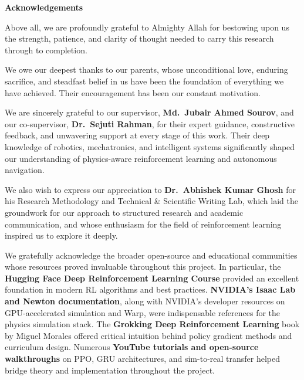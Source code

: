 \documentclass[12pt,a4paper]{article}
\begin{document}
\thispagestyle{empty}
\vspace*{0.5cm}
\begin{center}
    {\Large\textbf{Acknowledgements}}
\end{center}
\vspace{1.2cm}

\noindent
Above all, we are profoundly grateful to Almighty Allah for bestowing upon us the strength, patience, and clarity of thought needed to carry this research through to completion.

\vspace{0.8em}
\noindent
We owe our deepest thanks to our parents, whose unconditional love, enduring sacrifice, and steadfast belief in us have been the foundation of everything we have achieved. Their encouragement has been our constant motivation.

\vspace{0.8em}
\noindent
We are sincerely grateful to our supervisor, \textbf{Md.\ Jubair Ahmed Sourov}, and our co-supervisor, \textbf{Dr.\ Sejuti Rahman}, for their expert guidance, constructive feedback, and unwavering support at every stage of this work. Their deep knowledge of robotics, mechatronics, and intelligent systems significantly shaped our understanding of physics-aware reinforcement learning and autonomous navigation.

\vspace{0.8em}
\noindent
We also wish to express our appreciation to \textbf{Dr.\ Abhishek Kumar Ghosh} for his Research Methodology and Technical \& Scientific Writing Lab, which laid the groundwork for our approach to structured research and academic communication, and whose enthusiasm for the field of reinforcement learning inspired us to explore it deeply.

\vspace{0.8em}
\noindent
We gratefully acknowledge the broader open-source and educational communities whose resources proved invaluable throughout this project. In particular, the \textbf{Hugging Face Deep Reinforcement Learning Course} provided an excellent foundation in modern RL algorithms and best practices. \textbf{NVIDIA's Isaac Lab and Newton documentation}, along with NVIDIA's developer resources on GPU-accelerated simulation and Warp, were indispensable references for the physics simulation stack. The \textbf{Grokking Deep Reinforcement Learning} book by Miguel Morales offered critical intuition behind policy gradient methods and curriculum design. Numerous \textbf{YouTube tutorials and open-source walkthroughs} on PPO, GRU architectures, and sim-to-real transfer helped bridge theory and implementation throughout the project.
\end{document}
